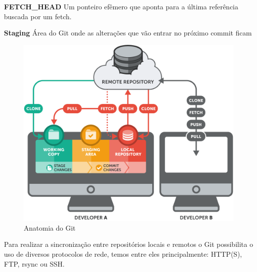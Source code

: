         	\textbf{FETCH\_HEAD}
        	\newline
        	Um ponteiro efêmero que aponta para a última referência buscada por um fetch.
        	
        	\textbf{Staging}
        	\newline
        	Área do Git onde as alterações que vão entrar no próximo commit ficam
        	
        	\begin{figure}[htbp]
        		\caption{\label{fig_git1}Anatomia do Git}
        		\begin{center}
        		\includegraphics[scale=0.4]{pictures/git.png}
        		\end{center}
        	\end{figure}
        	
        	Para realizar a sincronização entre repositórios locais e remotos o Git possibilita o uso de diversos protocolos de rede, temos entre eles principalmente: HTTP(S), FTP, rsync ou SSH.
        	
